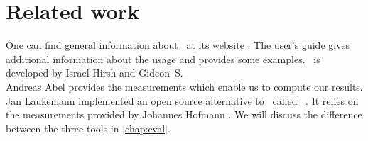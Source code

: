 \section{Related work}

One can find general information about \iaca\ at its website \cite{iaca}. The user's guide \cite{userguide} gives additional information about the usage and provides some examples. \iaca\ is developed by Israel Hirsh and Gideon~S.\\

Andreas Abel \cite{Andreas} provides the measurements which enable us to compute our results.\\

Jan Laukemann \cite{osaca-thesis} implemented an open source alternative to \iaca\ called \osaca\ \cite{osaca-web}. It relies on the measurements provided by Johannes Hofmann \cite{ibench}. We will discuss the difference between the three tools in \autoref{chap:eval}.
